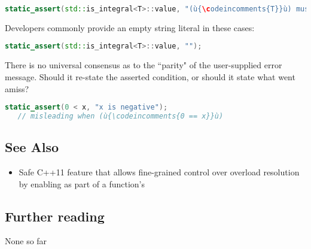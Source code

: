 \begin{lstlisting}[language=C++]
static_assert(std::is_integral<T>::value, "(ù{\codeincomments{T}}ù) must be an integral type.");
\end{lstlisting}
    
\noindent Developers commonly provide an empty string literal in these
cases:

\begin{lstlisting}[language=C++]
static_assert(std::is_integral<T>::value, "");
\end{lstlisting}

There is no universal consensus as to the ``parity" of the user-supplied error message.  Should it re-state the asserted condition, or should it state what went amiss?  
\begin{lstlisting}[language=C++]
static_assert(0 < x, "x is negative"); 
   // misleading when (ù{\codeincomments{0 == x}}ù)
\end{lstlisting}    

\subsection[See Also]{See Also}\label{see-also}

\begin{itemize}
\item{%
Safe C++11 feature that allows fine-grained control over overload resolution by enabling  as part of a function’s }
\end{itemize}

\subsection[Further reading]{Further reading}\label{further-reading}

None so far


